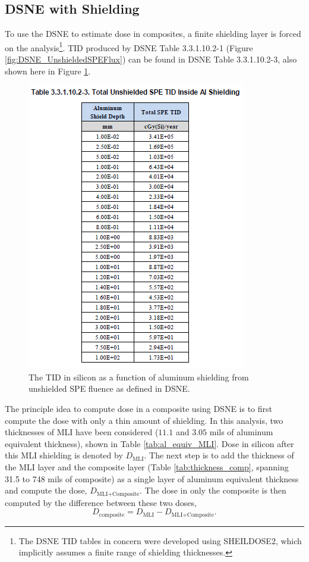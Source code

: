 \documentclass{hitec}
\begin{document}
\subsection{DSNE with Shielding}\label{ssec:DSNEwithShielding}

To use the DSNE to estimate dose in composites, a finite shielding layer is forced on the analysis\footnote{The DSNE TID tables in concern were developed using SHEILDOSE2, which implicitly assumes a finite range of shielding thicknesses.}. TID produced by DSNE Table 3.3.1.10.2-1 (Figure \ref{fig:DSNE_UnshieldedSPEFlux}) can be found in DSNE Table 3.3.1.10.2-3, also shown here in Figure \ref{fig:DSNE_UnshieldedSPETID}.

\begin{figure}[h!]
	\centering
	\includegraphics[scale=1.0]{DSNE_3.3.1.10.2-3.png}
	\caption{The TID in silicon as a function of aluminum shielding from unshielded SPE fluence as defined in DSNE.}\label{fig:DSNE_UnshieldedSPETID}
\end{figure}

The principle idea to compute dose in a composite using DSNE is to first compute the dose with only a thin amount of shielding. In this analysis, two thicknesses of MLI have been considered ($11.1$ and $3.05$ mils of aluminum equivalent thickness), shown in Table \ref{tab:al_equiv_MLI}. Dose in silicon after this MLI shielding is denoted by $D_{\text{MLI}}$. The next step is to add the thickness of the MLI layer and the composite layer (Table \ref{tab:thickness_comp}, spanning 31.5 to 748 mils of composite) as a single layer of aluminum equivalent thickness and compute the dose, $D_{\text{MLI+Composite}}$. The dose in only the composite is then computed by the difference between these two doses,
\begin{equation}
D_{\text{composite}} = D_{\text{MLI}} - D_{\text{MLI+Composite}}.
\end{equation}
\end{document}
